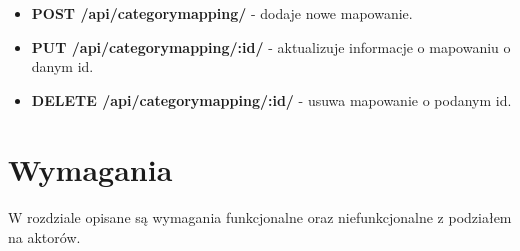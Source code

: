 \documentclass{article}
\begin{document}
\begin{itemize}
\begin{itemize}
				\item \textbf{POST /api/categorymapping/} - dodaje nowe mapowanie.
				
				\item \textbf{PUT /api/categorymapping/:id/} - aktualizuje informacje o mapowaniu o danym id.
				
				\item \textbf{DELETE /api/categorymapping/:id/} - usuwa mapowanie o podanym id.
			\end{itemize}
	\end{itemize}
	\section{Wymagania}
	\paragraph{} W rozdziale opisane są wymagania funkcjonalne oraz niefunkcjonalne z podziałem na aktorów.
\end{document}
